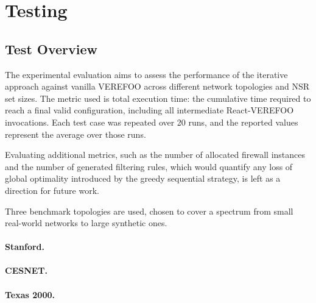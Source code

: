 \section{Testing}

\subsection{Test Overview}

The experimental evaluation aims to assess the performance of the iterative approach against vanilla VEREFOO across different network topologies and NSR set sizes. The metric used is total execution time: the cumulative time required to reach a final valid configuration, including all intermediate React-VEREFOO invocations. Each test case was repeated over 20 runs, and the reported values represent the average over those runs.

Evaluating additional metrics, such as the number of allocated firewall instances and the number of generated filtering rules, which would quantify any loss of global optimality introduced by the greedy sequential strategy, is left as a direction for future work.

Three benchmark topologies are used, chosen to cover a spectrum from small real-world networks to large synthetic ones.

\paragraph{Stanford.}

\paragraph{CESNET.}

\paragraph{Texas 2000.}


